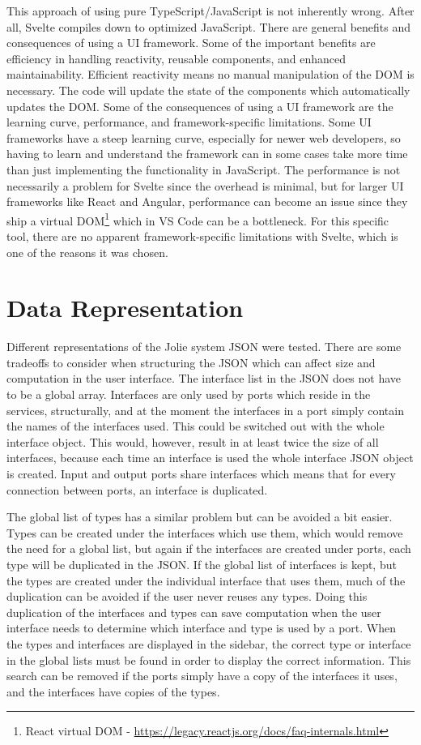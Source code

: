 This approach of using pure TypeScript/JavaScript is not inherently wrong. After all, Svelte compiles down to optimized JavaScript.
There are general benefits and consequences of using a UI framework. Some of the important benefits are efficiency in handling reactivity, reusable components, and enhanced maintainability.
Efficient reactivity means no manual manipulation of the DOM is necessary. The code will update the state of the components which automatically updates the DOM.
Some of the consequences of using a UI framework are the learning curve, performance, and framework-specific limitations.
Some UI frameworks have a steep learning curve, especially for newer web developers, so having to learn and understand the framework can in some cases take more time than just implementing the functionality in JavaScript.
The performance is not necessarily a problem for Svelte since the overhead is minimal, but for larger UI frameworks like React and Angular, performance can become an issue since they ship a virtual DOM\footnote{React virtual DOM - \url{https://legacy.reactjs.org/docs/faq-internals.html}} which in VS Code can be a bottleneck.
For this specific tool, there are no apparent framework-specific limitations with Svelte, which is one of the reasons it was chosen.

\section{Data Representation}
Different representations of the Jolie system JSON were tested. There are some tradeoffs to consider when structuring the JSON which can affect size and computation in the user interface.
The interface list in the JSON does not have to be a global array. Interfaces are only used by ports which reside in the services, structurally, and at the moment the interfaces in a port simply contain the names of the interfaces used. This could be switched out with the whole interface object.
This would, however, result in at least twice the size of all interfaces, because each time an interface is used the whole interface JSON object is created. Input and output ports share interfaces which means that for every connection between ports, an interface is duplicated.

The global list of types has a similar problem but can be avoided a bit easier. Types can be created under the interfaces which use them, which would remove the need for a global list, but again if the interfaces are created under ports, each type will be duplicated in the JSON. 
If the global list of interfaces is kept, but the types are created under the individual interface that uses them, much of the duplication can be avoided if the user never reuses any types. Doing this duplication of the interfaces and types can save computation when the user interface needs to determine which interface and type is used by a port. 
When the types and interfaces are displayed in the sidebar, the correct type or interface in the global lists must be found in order to display the correct information. This search can be removed if the ports simply have a copy of the interfaces it uses, and the interfaces have copies of the types.


